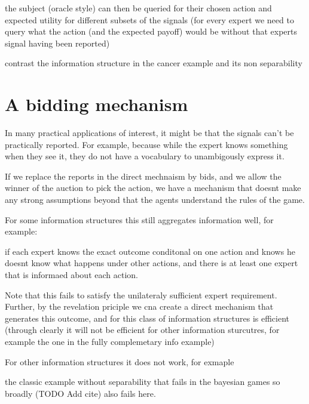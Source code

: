 the subject (oracle style) can then be queried for their chosen action and expected utility for different subsets of the signals (for every expert we need to query what the action (and the expected payoff) would be without that experts signal having been reported)

contrast the information structure in the cancer example and its non separability 


\section{A bidding mechanism }

In many practical applications of interest, it might be that the signals can't be practically reported. For example, because while the expert knows something when they see it, they do not have a vocabulary to unambigously express it. 


If we replace the reports in the direct mechnaism by bids, and we allow the winner of the auction to pick the action, we have a mechanism that doesnt make any strong assumptions beyond that the agents understand the rules of the game.

For some information structures this still aggregates information well, for example:

\begin{lem}
	if each expert knows the exact outcome conditonal on one action and knows he doesnt know what happens under other actions, and there is at least one expert that is informaed about each action.
\end{lem}

Note that this fails to satisfy the unilateraly sufficient expert requirement. Further, by the revelation priciple we cna create a direct mechanism that generates this outcome, and for this class of information structures is efficient (through clearly it will not be efficient for other information sturcutres, for example the one in the fully complemetary info example)

For other information structures it does not work, for exmaple 
\begin{eg}
	the classic example without separability that fails in the bayesian games so broadly (TODO Add cite) also fails here. 
\end{eg}


